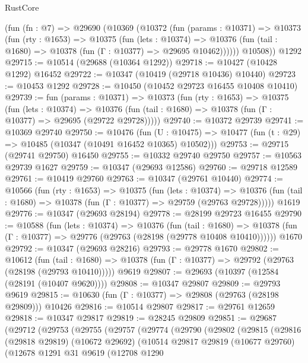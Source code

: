 \begin{lexlean}{RustCore}
\begin{coremodule}
    (fun (fn : @7) =>
    @29690
      (@10369
        (@10372
          (fun (params : @10371) =>
          @10373
            (fun (rty : @1653) =>
            @10375
              (fun (lets : @10374) =>
              @10376 (fun (tail : @1680) => @10378 (fun (Γ : @10377) => @29695 @10462))))))
        @10508))
    @1292
@29715 := @10514 (@29688 (@10364 @1292))
@29718 := @10427 (@10428 @1292) @16452
@29722 := @10347 (@10419 (@29718 @10436) @10440)
@29723 := @10453 @1292
@29728 := @10450 (@10452 @29723 @16455 @10408 @10410)
@29739 := fun (params : @10371) =>
  @10373
    (fun (rty : @1653) =>
    @10375
      (fun (lets : @10374) =>
      @10376 (fun (tail : @1680) => @10378 (fun (Γ : @10377) => @29695 (@29722 @29728)))))
@29740 := @10372 @29739
@29741 := @10369 @29740
@29750 := @10476
    (fun (U : @10475) => @10477 (fun (t : @29) => @10485 (@10347 (@10491 @16452 @10365) @10502)))
@29753 := @29715 (@29741 @29750) @16450
@29755 := @10332 @29740 @29750
@29757 := @10563 @29739 @1627
@29759 := @10347 (@29693 @12586)
@29760 := @29718 @12589
@29761 := @10419 @29760
@29763 := @10347 (@29761 @10440)
@29774 := @10566
    (fun (rty : @1653) =>
    @10375
      (fun (lets : @10374) =>
      @10376 (fun (tail : @1680) => @10378 (fun (Γ : @10377) => @29759 (@29763 @29728)))))
    @1619
@29776 := @10347 (@29693 @28194)
@29778 := @28199 @29723 @16455
@29790 := @10588
    (fun (lets : @10374) =>
    @10376
      (fun (tail : @1680) =>
      @10378 (fun (Γ : @10377) => @29776 (@29763 (@28198 (@29778 @10408 @10410))))))
    @1670
@29792 := @10347 (@29693 @28216)
@29793 := @29778 @1670
@29802 := @10612
    (fun (tail : @1680) => @10378 (fun (Γ : @10377) => @29792 (@29763 (@28198 (@29793 @10410)))))
    @9619
@29807 := @29693 (@10397 (@12584 (@28191 (@10407 @9620))))
@29808 := @10347 @29807
@29809 := @29793 @9619
@29815 := @10630 (fun (Γ : @10377) => @29808 (@29763 (@28198 @29809))) @10426
@29816 := @10514 @29807
@29817 := @29761 @12659
@29818 := @10347 @29817
@29819 := @28245 @29809
@29851 := @29687
    (@29712
      (@29753
        (@29755
          (@29757
            (@29774
              (@29790
                (@29802
                  (@29815
                    (@29816
                      (@29818 @29819)
                      (@10672 @29692)
                      (@10514
                        @29817
                        @29819
                        (@10677 @29760)
                        (@12678
                          @1291
                          @31
                          @9619
                          (@12708
                            @1290

\end{coremodule}
\end{lexlean}
